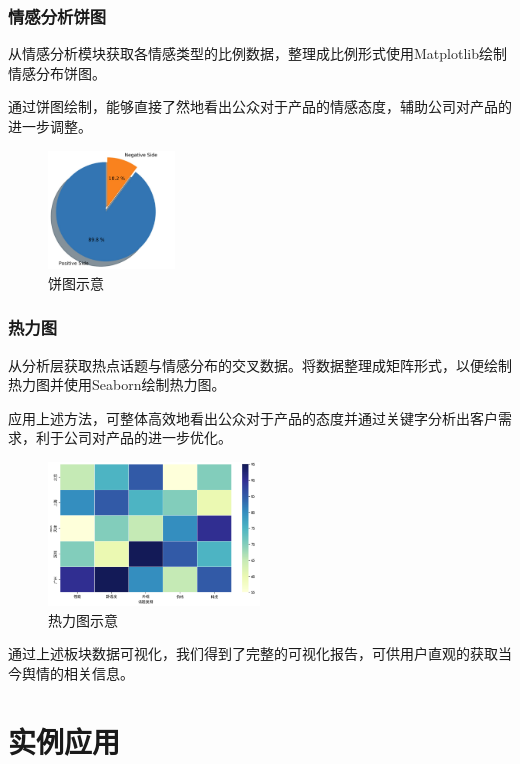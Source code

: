 \documentclass[UTF8,a4paper,15pt,titlepage,oneside]{ctexbook}
\begin{document}
\subsubsection{情感分析饼图}

从情感分析模块获取各情感类型的比例数据，整理成比例形式使用Matplotlib绘制情感分布饼图。

通过饼图绘制，能够直接了然地看出公众对于产品的情感态度，辅助公司对产品的进一步调整。

\begin{figure}[H]
  \centering
  \includegraphics[width=0.3\textwidth,keepaspectratio=false]{pictures/35.png} %
  \caption{饼图示意}
\end{figure}

\subsubsection{热力图}

从分析层获取热点话题与情感分布的交叉数据。将数据整理成矩阵形式，以便绘制热力图并使用Seaborn绘制热力图。

应用上述方法，可整体高效地看出公众对于产品的态度并通过关键字分析出客户需求，利于公司对产品的进一步优化。

\begin{figure}[H]
  \centering
  \includegraphics[width=0.5\textwidth,keepaspectratio=false]{pictures/6.png} %
  \caption{热力图示意}
\end{figure}


通过上述板块数据可视化，我们得到了完整的可视化报告，可供用户直观的获取当今舆情的相关信息。

\section{实例应用}
\end{document}
